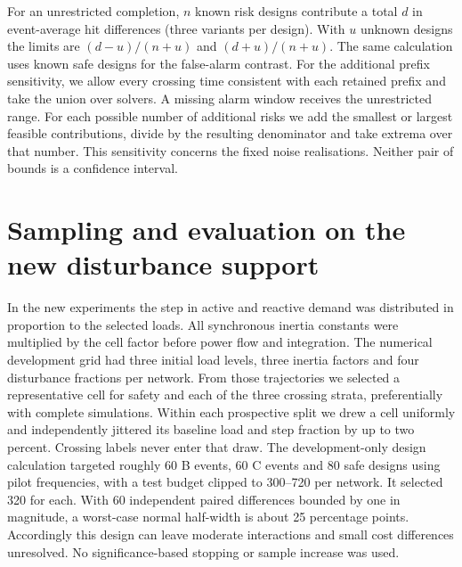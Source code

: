 \documentclass[10pt]{article}
\begin{document}
For an unrestricted completion, $n$ known risk designs contribute a total $d$ in event-average hit differences (three variants per design). With $u$ unknown designs the limits are $(d-u)/(n+u)$ and $(d+u)/(n+u)$. The same calculation uses known safe designs for the false-alarm contrast. For the additional prefix sensitivity, we allow every crossing time consistent with each retained prefix and take the union over solvers. A missing alarm window receives the unrestricted range. For each possible number of additional risks we add the smallest or largest feasible contributions, divide by the resulting denominator and take extrema over that number. This sensitivity concerns the fixed noise realisations. Neither pair of bounds is a confidence interval.

\section{Sampling and evaluation on the new disturbance support}
In the new experiments the step in active and reactive demand was distributed in proportion to the selected loads. All synchronous inertia constants were multiplied by the cell factor before power flow and integration. The numerical development grid had three initial load levels, three inertia factors and four disturbance fractions per network. From those trajectories we selected a representative cell for safety and each of the three crossing strata, preferentially with complete simulations. Within each prospective split we drew a cell uniformly and independently jittered its baseline load and step fraction by up to two percent. Crossing labels never enter that draw. The development-only design calculation targeted roughly 60 B events, 60 C events and 80 safe designs using pilot frequencies, with a test budget clipped to 300--720 per network. It selected 320 for each. With 60 independent paired differences bounded by one in magnitude, a worst-case normal half-width is about 25 percentage points. Accordingly this design can leave moderate interactions and small cost differences unresolved. No significance-based stopping or sample increase was used.
\end{document}
